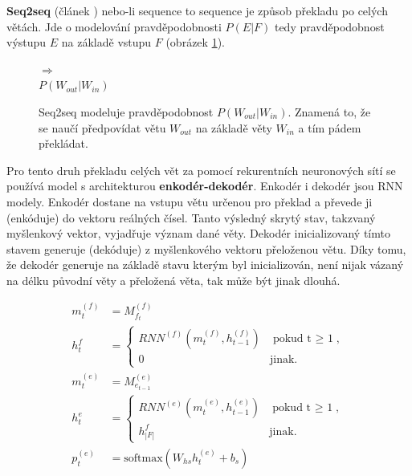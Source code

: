 \textbf{Seq2seq} (článek \cite{seq2seq}) nebo-li sequence to sequence je způsob překladu po celých větách. Jde o modelování pravděpodobnosti $P(E|F)$ tedy pravděpodobnost výstupu $E$ na základě vstupu $F$ (obrázek \ref{figure:seqProbability}).

\begin{figure}[H]
    \begin{center}
        \setlength{\fboxsep}{8pt}
        $\Longrightarrow$
        \\ \vspace{5mm}
        $P(W_{out}|W_{in})$
    \end{center}
	\caption{Seq2seq modeluje pravděpodobnost $P(W_{out}|W_{in})$. Znamená to, že se naučí předpovídat větu $W_{out}$ na základě věty $W_{in}$ a tím pádem překládat.}
	\label{figure:seqProbability}
\end{figure}

Pro tento druh překladu celých vět za pomocí rekurentních neuronových sítí se používá model s architekturou \textbf{enkodér-dekodér}. Enkodér i dekodér jsou RNN modely. Enkodér dostane na vstupu větu určenou pro překlad a převede ji (enkóduje) do vektoru reálných čísel. Tanto výsledný skrytý stav, takzvaný myšlenkový vektor, vyjadřuje význam dané věty. Dekodér inicializovaný tímto stavem generuje (dekóduje) z myšlenkového vektoru přeloženou větu. Díky tomu, že dekodér generuje na základě stavu kterým byl inicializován, není nijak vázaný na délku původní věty a přeložená věta, tak může být jinak dlouhá.


\begin{align}
    m^{(f)}_{t}&=M^{(f)}_{f_t}\label{figure:encoderEmb} \\
    h^{f}_{t}&=\begin{cases}
                    RNN^{(f)}(m^{(f)}_{t},h^{(f)}_{t-1}) & \mbox{pokud t $\geq$ 1},\label{figure:encoderState} \\
                    0 & \mbox{jinak}.
                \end{cases}\\
    m^{(e)}_{t}&=M^{(e)}_{e_{t-1}}\label{figure:decoderEmb} \\
    h^{e}_{t}&=\begin{cases}
                    RNN^{(e)}(m^{(e)}_{t},h^{(e)}_{t-1}) & \mbox{pokud t $\geq$ 1},\\
                    h^{f}_{|F|} & \mbox{jinak}.
                \end{cases}\label{figure:decoderState} \\
    p^{(e)}_{t}&=\mbox{softmax}(W_{hs}h^{(e)}_{t} + b_{s}) \label{figure:resultSoftmax}
\end{align}


